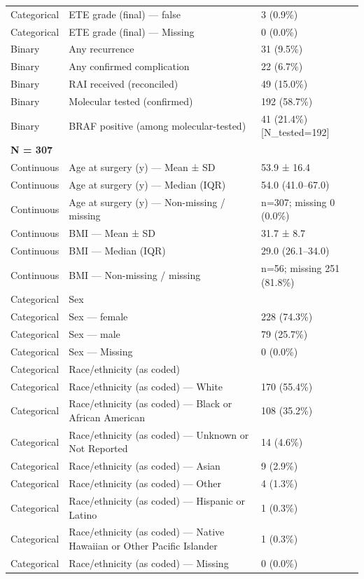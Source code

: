 \begin{table}[htbp]
\begin{tabular}{lll}
Categorical & ETE grade (final) — false & 3 (0.9\%) \\
Categorical & ETE grade (final) — Missing & 0 (0.0\%) \\
Binary & Any recurrence & 31 (9.5\%) \\
Binary & Any confirmed complication & 22 (6.7\%) \\
Binary & RAI received (reconciled) & 49 (15.0\%) \\
Binary & Molecular tested (confirmed) & 192 (58.7\%) \\
Binary & BRAF positive (among molecular-tested) & 41 (21.4\%) [N\_tested=192] \\
\multicolumn{3}{l}{\textbf{N = 307}} \\
Continuous & Age at surgery (y) — Mean ± SD & 53.9 ± 16.4 \\
Continuous & Age at surgery (y) — Median (IQR) & 54.0 (41.0–67.0) \\
Continuous & Age at surgery (y) — Non-missing / missing & n=307; missing 0 (0.0\%) \\
Continuous & BMI — Mean ± SD & 31.7 ± 8.7 \\
Continuous & BMI — Median (IQR) & 29.0 (26.1–34.0) \\
Continuous & BMI — Non-missing / missing & n=56; missing 251 (81.8\%) \\
Categorical & Sex &  \\
Categorical & Sex — female & 228 (74.3\%) \\
Categorical & Sex — male & 79 (25.7\%) \\
Categorical & Sex — Missing & 0 (0.0\%) \\
Categorical & Race/ethnicity (as coded) &  \\
Categorical & Race/ethnicity (as coded) — White & 170 (55.4\%) \\
Categorical & Race/ethnicity (as coded) — Black or African American & 108 (35.2\%) \\
Categorical & Race/ethnicity (as coded) — Unknown or Not Reported & 14 (4.6\%) \\
Categorical & Race/ethnicity (as coded) — Asian & 9 (2.9\%) \\
Categorical & Race/ethnicity (as coded) — Other & 4 (1.3\%) \\
Categorical & Race/ethnicity (as coded) — Hispanic or Latino & 1 (0.3\%) \\
Categorical & Race/ethnicity (as coded) — Native Hawaiian or Other Pacific Islander & 1 (0.3\%) \\
Categorical & Race/ethnicity (as coded) — Missing & 0 (0.0\%) \\

\end{tabular}
\end{table}

